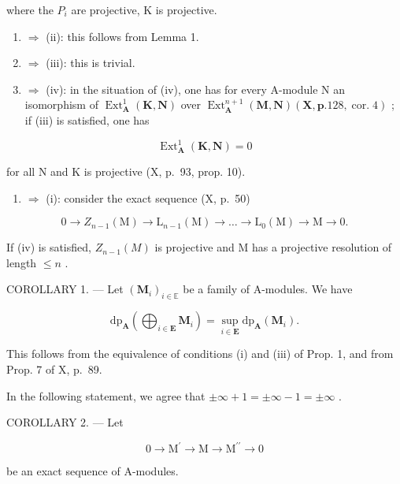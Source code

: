 where the \(P_{i}\) are projective, K is projective.

\begin{enumerate}
\def\labelenumi{(\roman{enumi})}
\item
  \(\Rightarrow\) (ii): this follows from Lemma 1.
\item
  \(\Rightarrow\) (iii): this is trivial.
\item
  \(\Rightarrow\) (iv): in the situation of (iv), one has for every A-module N an isomorphism of \(\operatorname{Ext}_{\mathbf{A}}^{1}(\mathbf{K},\mathbf{N})\) over \(\operatorname{Ext}_{\mathbf{A}}^{n + 1}(\mathbf{M},\mathbf{N})(\mathbf{X},\mathbf{p}.128,\operatorname{cor.}4)\) ; if (iii) is satisfied, one has
\end{enumerate}

\[
\operatorname{Ext} _ {\mathbf {A}} ^ {1} (\mathbf {K}, \mathbf {N}) = 0
\]

for all N and K is projective (X, p.~93, prop. 10).

\begin{enumerate}
\def\labelenumi{(\roman{enumi})}
\setcounter{enumi}{3}
\tightlist
\item
  \(\Rightarrow\) (i): consider the exact sequence (X, p.~50)
\end{enumerate}

\[
0 \to Z _ {n - 1} (\mathrm{M}) \to \mathrm{L} _ {n - 1} (\mathrm{M}) \to \dots \to \mathrm{L} _ {0} (\mathrm{M}) \to \mathrm{M} \to 0.
\]

If (iv) is satisfied, \(Z_{n-1}(M)\) is projective and M has a projective resolution of length \(\leqslant n\) .

COROLLARY 1. --- Let \((\mathbf{M}_i)_{i\in \mathbb{E}}\) be a family of A-modules. We have

\[
\mathrm{dp} _ {\mathbf {A}} \left(\bigoplus_ {i \in \mathbf {E}} \mathbf {M} _ {i}\right) = \sup _ {i \in \mathbf {E}} \mathrm{dp} _ {\mathbf {A}} (\mathbf {M} _ {i}).
\]

This follows from the equivalence of conditions (i) and (iii) of Prop. 1, and from Prop. 7 of X, p.~89.

In the following statement, we agree that \(\pm\infty + 1 = \pm\infty - 1 = \pm\infty\) .

COROLLARY 2. --- Let

\[
0 \rightarrow \mathrm{M} ^ {\prime} \rightarrow \mathrm{M} \rightarrow \mathrm{M} ^ {\prime \prime} \rightarrow 0
\]

be an exact sequence of A-modules.

